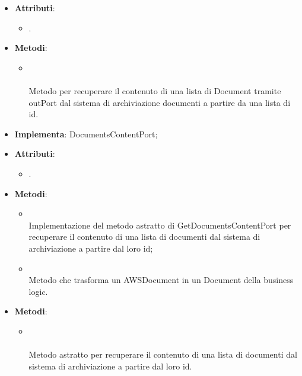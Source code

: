 \documentclass[10pt, a4paper]{article}
\begin{document}
\label{GetDocumentsContentDettaglio}
\begin{itemize}
    \item \textbf{Attributi}:
    \begin{itemize}
        \item {}.
    \end{itemize}
    \item \textbf{Metodi}:
    \begin{itemize}
        \item {}\\ \\
        Metodo per recuperare il contenuto di una lista di Document tramite outPort dal sistema di archiviazione documenti a partire da una lista di id.
    \end{itemize}
\end{itemize}

\label{GetDocumentsContentAWSS3Dettaglio}
\begin{itemize}
    \item \textbf{Implementa}: DocumentsContentPort;
    \item \textbf{Attributi}:
    \begin{itemize}
        \item {}.
    \end{itemize}
    \item \textbf{Metodi}:
    \begin{itemize}
        \item {}\\
        Implementazione del metodo astratto di GetDocumentsContentPort per recuperare il contenuto di una lista di documenti dal sistema di archiviazione a partire dal loro id;
        \item {}\\
        Metodo che trasforma un AWSDocument in un Document della business logic.
    \end{itemize}
\end{itemize}



\label{GetDocumentsContentPortDettaglio}
\begin{itemize}
    \item \textbf{Metodi}:
    \begin{itemize}
        \item {}\\ \\
        Metodo astratto per recuperare il contenuto di una lista di documenti dal sistema di archiviazione a partire dal loro id.
    \end{itemize}
\end{itemize}
\end{document}
